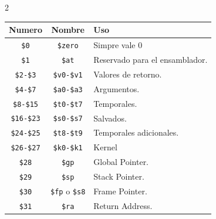 \documentclass[11pt, a4paper]{article}
\begin{document}
\begin{multicols*}{2}
        \begin{tcolorbox}[
        colback=white, %
        colframe=blue!40!black, %
        title= {\centering \textbf{Banco de Registros MIPS32} },
        fonttitle=\bfseries,
        size=small
        ]
            \begin{tabularx}{\linewidth}{ccX}
                \toprule
                \textbf{Numero} & \textbf{Nombre} & \textbf{Uso} \\
                \midrule
                \texttt{\$0} & \texttt{\$zero} & Simpre vale 0 \\
                \texttt{\$1} & \texttt{\$at} & Reservado para el ensamblador. \\
                \texttt{\$2-\$3} & \texttt{\$v0-\$v1} & Valores de retorno. \\
                \texttt{\$4-\$7} & \texttt{\$a0-\$a3} & Argumentos.  \\
                \texttt{\$8-\$15} & \texttt{\$t0-\$t7} & Temporales. \\
                \texttt{\$16-\$23} & \texttt{\$s0-\$s7} & Salvados. \\
                \texttt{\$24-\$25} & \texttt{\$t8-\$t9} & Temporales adicionales. \\
                \texttt{\$26-\$27} & \texttt{\$k0-\$k1} & Kernel \\
                \texttt{\$28} & \texttt{\$gp} & Global Pointer. \\
                \texttt{\$29} & \texttt{\$sp} & Stack Pointer.  \\
                \texttt{\$30} & \texttt{\$fp} o \texttt{\$s8} & Frame Pointer.  \\
                \texttt{\$31} & \texttt{\$ra} & Return Address. \\
            \end{tabularx}
        \end{tcolorbox}
        \vfill\null\columnbreak


\end{multicols*}
\end{document}
